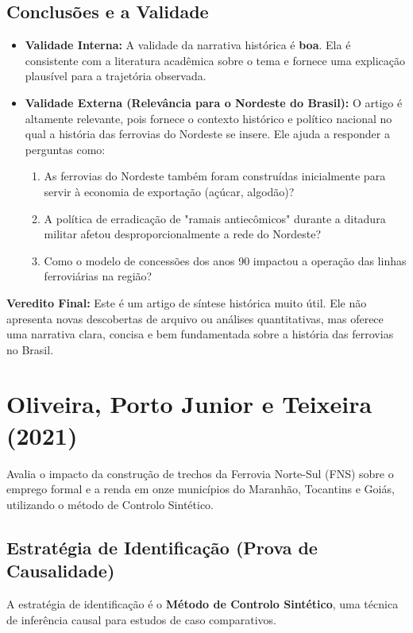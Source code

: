 \documentclass[12pt, a4paper]{article}
\begin{document}
\subsection{Conclusões e a Validade}
\begin{itemize}
    \item \textbf{Validade Interna:} A validade da narrativa histórica é \textbf{boa}. Ela é consistente com a literatura acadêmica sobre o tema e fornece uma explicação plausível para a trajetória observada.
    \item \textbf{Validade Externa (Relevância para o Nordeste do Brasil):} O artigo é altamente relevante, pois fornece o contexto histórico e político nacional no qual a história das ferrovias do Nordeste se insere. Ele ajuda a responder a perguntas como:
        \begin{enumerate}
            \item As ferrovias do Nordeste também foram construídas inicialmente para servir à economia de exportação (açúcar, algodão)?
            \item A política de erradicação de "ramais antiecômicos" durante a ditadura militar afetou desproporcionalmente a rede do Nordeste?
            \item Como o modelo de concessões dos anos 90 impactou a operação das linhas ferroviárias na região?
        \end{enumerate}
\end{itemize}

\noindent\textbf{Veredito Final:} Este é um artigo de síntese histórica muito útil. Ele não apresenta novas descobertas de arquivo ou análises quantitativas, mas oferece uma narrativa clara, concisa e bem fundamentada sobre a história das ferrovias no Brasil.

\section{Oliveira, Porto Junior e Teixeira (2021)}
Avalia o impacto da construção de trechos da Ferrovia Norte-Sul (FNS) sobre o emprego formal e a renda em onze municípios do Maranhão, Tocantins e Goiás, utilizando o método de Controlo Sintético.

\subsection{Estratégia de Identificação (Prova de Causalidade)}
A estratégia de identificação é o \textbf{Método de Controlo Sintético}, uma técnica de inferência causal para estudos de caso comparativos.
\end{document}
